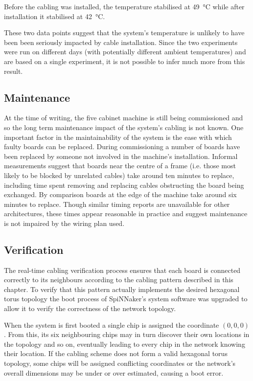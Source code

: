 			Before the cabling was installed, the temperature stabilised at
			\SI{49}{\celsius} while after installation it stabilised at
			\SI{42}{\celsius}.
			
			These two data points suggest that the system's temperature is unlikely
			to have been been seriously impacted by cable installation. Since the two
			experiments were run on different days (with potentially different
			ambient temperatures) and are based on a single experiment, it is not
			possible to infer much more from this result.
			
		\subsection{Maintenance}
			
			At the time of writing, the five cabinet machine is still being
			commissioned and so the long term maintenance impact of the system's
			cabling is not known. One important factor in the maintainability of the
			system is the ease with which faulty boards can be replaced. During
			commissioning a number of boards have been replaced by someone not
			involved in the machine's installation. Informal measurements suggest
			that boards near the centre of a frame (i.e. those most likely to be
			blocked by unrelated cables) take around ten minutes to replace,
			including time spent removing and replacing cables obstructing the board
			being exchanged. By comparison boards at the edge of the machine take
			around six minutes to replace. Though similar timing reports are
			unavailable for other architectures, these times appear reasonable in
			practice and suggest maintenance is not impaired by the wiring plan used.
		
		\subsection{Verification}
			
			The real-time cabling verification process ensures that each board is
			connected correctly to its neighbours according to the cabling pattern
			described in this chapter. To verify that this pattern actually
			implements the desired hexagonal torus topology the boot process of
			SpiNNaker's system software was upgraded to allow it to verify the
			correctness of the network topology.
			
			When the system is first booted a single chip is assigned the coordinate
			$(0, 0, 0)$. From this, its six neighbouring chips may in turn discover
			their own locations in the topology and so on, eventually leading to
			every chip in the network knowing their location. If the cabling scheme
			does not form a valid hexagonal torus topology, some chips will be
			assigned conflicting coordinates or the network's overall dimensions may
			be under or over estimated, causing a boot error.
			
